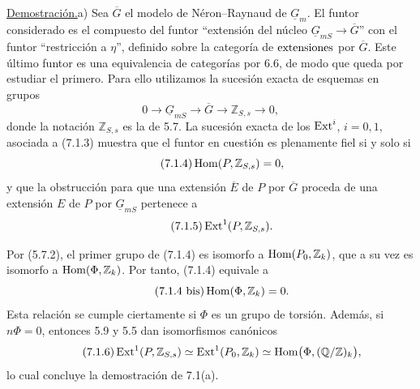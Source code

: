 
\medskip
\noindent\underline{Demostración.}\quad a) Sea $\overline G$ el modelo
de Néron--Raynaud de $\underline G_m$. El funtor considerado es el
compuesto del funtor ``extensión del núcleo
$\underline G_{mS}\to\overline G$'' con el funtor ``restricción a
$\eta$'', definido sobre la categoría de
$\sisi{\text{biextensiones}}{\text{extensiones}}$ por $\overline G$.
Este último funtor es una equivalencia de categorías por 6.6, de modo
que queda por estudiar el primero. Para ello utilizamos la sucesión
exacta de esquemas en grupos
\begin{equation}\tag{7.1.3}
 0\longrightarrow\underline G_{mS}\longrightarrow\overline G
 \longrightarrow\mathbb Z_{S,s}\longrightarrow0,
\end{equation}
donde la notación $\mathbb Z_{S,s}$ es la de 5.7. La sucesión exacta de
los $\Ext^i$, $i=0,1$, asociada a (7.1.3) muestra que el funtor en
cuestión es plenamente fiel si y solo si
\begin{equation}\tag{7.1.4}
 \Hom(P,\mathbb Z_{S,s})=0,
\end{equation}
y que la obstrucción para que una extensión $\overline E$ de $P$ por
$\overline G$ proceda de una extensión $E$ de $P$ por
$\underline G_{mS}$ pertenece a
\begin{equation}\tag{7.1.5}
 \Ext^1(P,\mathbb Z_{S,s}).
\end{equation}


Por (5.7.2), el primer grupo de (7.1.4) es isomorfo a
$\Hom(P_0,\mathbb Z_k)$, que a su vez es isomorfo a
$\Hom(\Phi,\mathbb Z_k)$. Por tanto, (7.1.4) equivale a
\begin{equation}\tag{7.1.4 bis}
 \Hom(\Phi,\mathbb Z_k)=0.
\end{equation}
Esta relación se cumple ciertamente si $\Phi$ es un grupo de torsión.
Además, si $n\Phi=0$, entonces 5.9 y 5.5 dan isomorfismos canónicos
\begin{equation}\tag{7.1.6}
 \Ext^1(P,\mathbb Z_{S,s})
 \simeq\Ext^1(P_0,\mathbb Z_k)
 \simeq\Hom\bigl(\Phi,(\mathbb Q/\mathbb Z)_k\bigr),
\end{equation}
lo cual concluye la demostración de 7.1(a).

